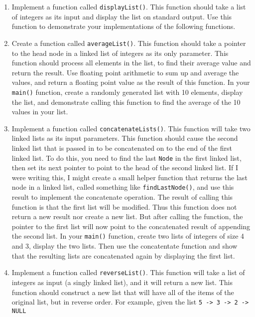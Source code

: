 \documentclass[11pt]{article}
\begin{document}
\begin{enumerate}
\item Implement a function called \verb~displayList()~.  This function should
   take a list of integers as its input and display the list on
   standard output.  Use this function to demonstrate your
   implementations of the following functions.
\item Create a function called \verb~averageList()~.  This function should
   take a pointer to the head node in a linked list of integers as its
   only parameter.  This function should process all elements in the
   list, to find their average value and return the result.  Use
   floating point arithmetic to sum up and average the values, and
   return a floating point value as the result of this function.  In
   your \verb~main()~ function, create a randomly generated list with 10
   elements, display the list, and demonstrate calling this function
   to find the average of the 10 values in your list.
\item Implement a function called \verb~concatenateLists()~.  This function
   will take two linked lists as its input parameters.  This function
   should cause the second linked list that is passed in to be
   concatenated on to the end of the first linked list.  To do this,
   you need to find the last \verb~Node~ in the first linked list, then set
   its next pointer to point to the head of the second linked list.
   If I were writing this, I might create a small helper function that
   returns the last node in a linked list, called something like
   \verb~findLastNode()~, and use this result to implement the concatenate
   operation.  The result of calling this function is that the first
   list will be modified.  Thus this function does not return a new
   result nor create a new list.  But after calling the function, the
   pointer to the first list will now point to the concatenated result
   of appending the second list.  In your \verb~main()~ function, create
   two lists of integers of size 4 and 3, display the two lists.  Then
   use the concatentate function and show that the resulting lists are
   concatenated again by displaying the first list.
\item Implement a function called \verb~reverseList()~.  This function will
   take a list of integers as input (a singly linked list), and it
   will return a new list.  This function should construct a new list
   that will have all of the items of the original list, but in
   reverse order.  For example, given the list \verb~5 -> 3 -> 2 -> NULL~ 

\end{enumerate}
\end{document}
